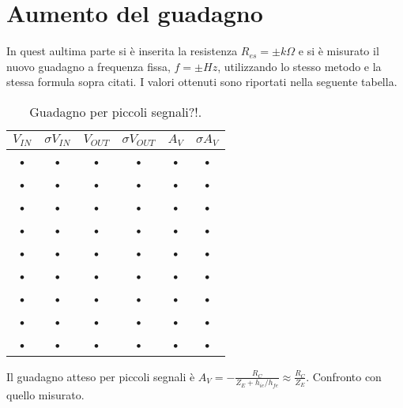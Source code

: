\documentclass[10pt,a4paper]{article}
\begin{document}
\section{Aumento del guadagno}
In quest aultima parte si è inserita la resistenza $R_{es}= \pm k\Omega$ e si è misurato il nuovo guadagno a frequenza fissa, $f= \pm Hz$, utilizzando lo stesso metodo e la stessa formula sopra citati. I valori ottenuti sono riportati nella seguente tabella.

\begin{table}[h]
\centering
\begin{tabular}{|c|c|c|c|c|c|}
\hline 
$V_{IN}$ & $\sigma V_{IN}$ & $V_{OUT}$ & $\sigma V_{OUT}$ & $A_V$ & $\sigma A_V$ \\ 
\hline 
• & • & • & • & • & • \\ 
\hline 
• & • & • & • & • & • \\ 
\hline 
• & • & • & • & • & • \\ 
\hline 
• & • & • & • & • & • \\ 
\hline 
• & • & • & • & • & • \\ 
\hline 
• & • & • & • & • & • \\ 
\hline 
• & • & • & • & • & • \\ 
\hline 
• & • & • & • & • & • \\ 
\hline 
• & • & • & • & • & • \\ 
\hline 
\end{tabular}
\caption{Guadagno per piccoli segnali?!.}
\end{table}

Il guadagno atteso per piccoli segnali è $A_V=-\frac{R_C}{Z_E+h_{ie}/h_{fe}}\approx\frac{R_C}{Z_E}$. Confronto con quello misurato.
\end{document}
